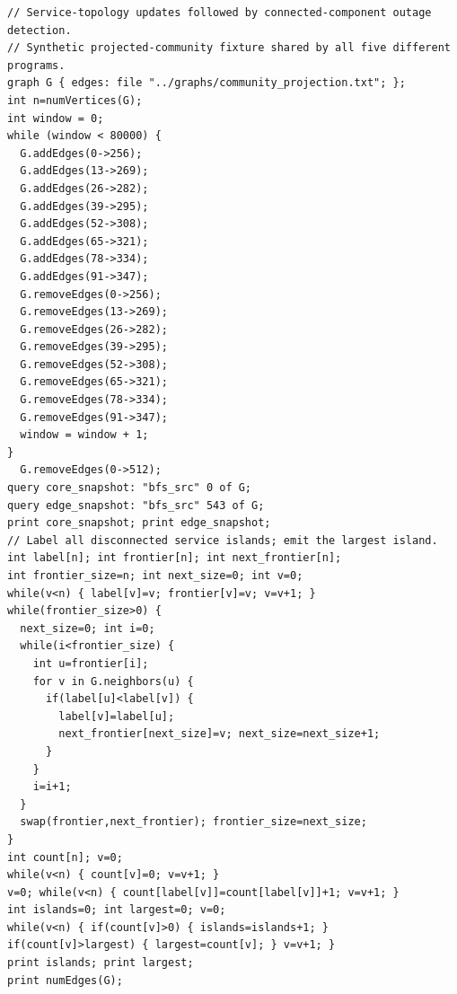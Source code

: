 \documentclass[10pt,a4paper]{article}
\begin{document}
\clearpage

\begin{lstlisting}[caption={Service islands},label={lst:service-islands}]
// Service-topology updates followed by connected-component outage detection.
// Synthetic projected-community fixture shared by all five different programs.
graph G { edges: file "../graphs/community_projection.txt"; };
int n=numVertices(G);
int window = 0;
while (window < 80000) {
  G.addEdges(0->256);
  G.addEdges(13->269);
  G.addEdges(26->282);
  G.addEdges(39->295);
  G.addEdges(52->308);
  G.addEdges(65->321);
  G.addEdges(78->334);
  G.addEdges(91->347);
  G.removeEdges(0->256);
  G.removeEdges(13->269);
  G.removeEdges(26->282);
  G.removeEdges(39->295);
  G.removeEdges(52->308);
  G.removeEdges(65->321);
  G.removeEdges(78->334);
  G.removeEdges(91->347);
  window = window + 1;
}
  G.removeEdges(0->512);
query core_snapshot: "bfs_src" 0 of G;
query edge_snapshot: "bfs_src" 543 of G;
print core_snapshot; print edge_snapshot;
// Label all disconnected service islands; emit the largest island.
int label[n]; int frontier[n]; int next_frontier[n];
int frontier_size=n; int next_size=0; int v=0;
while(v<n) { label[v]=v; frontier[v]=v; v=v+1; }
while(frontier_size>0) {
  next_size=0; int i=0;
  while(i<frontier_size) {
    int u=frontier[i];
    for v in G.neighbors(u) {
      if(label[u]<label[v]) {
        label[v]=label[u];
        next_frontier[next_size]=v; next_size=next_size+1;
      }
    }
    i=i+1;
  }
  swap(frontier,next_frontier); frontier_size=next_size;
}
int count[n]; v=0;
while(v<n) { count[v]=0; v=v+1; }
v=0; while(v<n) { count[label[v]]=count[label[v]]+1; v=v+1; }
int islands=0; int largest=0; v=0;
while(v<n) { if(count[v]>0) { islands=islands+1; } if(count[v]>largest) { largest=count[v]; } v=v+1; }
print islands; print largest;
print numEdges(G);
\end{lstlisting}

\clearpage
\end{document}
